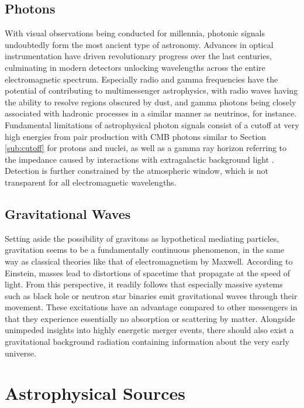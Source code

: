 \subsection{Photons}
\label{sub:photons}

With visual observations being conducted for millennia, photonic signals undoubtedly form the most ancient type of astronomy.
Advances in optical instrumentation have driven revolutionary progress over the last centuries, culminating in modern detectors
unlocking wavelengths across the entire electromagnetic spectrum. Especially radio and gamma frequencies have the potential of
contributing to multimessenger astrophysics, with radio waves having the ability to resolve regions obscured by dust, and gamma
photons being closely associated with hadronic processes in a similar manner as neutrinos, for instance. Fundamental limitations
of astrophysical photon signals consist of a cutoff at very high energies from pair production with CMB photons similar to
Section \ref{sub:cutoff} for protons and nuclei, as well as a gamma ray horizon referring to the impedance caused by
interactions with extragalactic background light \cite{Dominguez_2013}. Detection is further constrained by the atmospheric
window, which is not transparent for all electromagnetic wavelengths.



\subsection{Gravitational Waves}
\label{sub:gravitational}

Setting aside the possibility of gravitons as hypothetical mediating particles, gravitation seems to be a fundamentally continuous
phenomenon, in the same way as classical theories like that of electromagnetism by Maxwell. According to Einstein, masses lead to
distortions of spacetime that propagate at the speed of light. From this perspective, it readily follows that especially massive
systems such as black hole or neutron star binaries emit gravitational waves through their movement. These excitations have an
advantage compared to other messengers in that they experience essentially no absorption or scattering by matter. Alongside unimpeded
insights into highly energetic merger events, there should also exist a gravitational background radiation containing information about
the very early universe.



\section{Astrophysical Sources}
\label{sec:sources}

